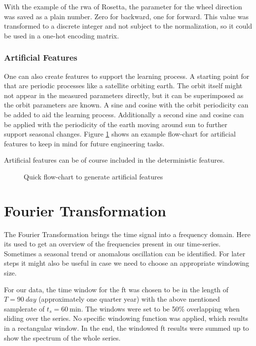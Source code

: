 		With the example of the \ac{rwa} of Rosetta, the parameter for the wheel direction was saved as a plain number. Zero for backward, one for forward. This value was transformed to a discrete integer and not subject to the normalization, so it could be used in a one-hot encoding matrix.		
		
		\subsubsection{Artificial Features}
		One can also create features to support the learning process. A starting point for that are periodic processes like a satellite orbiting earth. The orbit itself might not appear in the measured parameters directly, but it can be superimposed as the orbit parameters are known. A sine and cosine with the orbit periodicity can be added to aid the learning process. Additionally a second sine and cosine can be applied with the periodicity of the earth moving around sun to further support seasonal changes. Figure \ref{f:artificial_feature_example} shows an example flow-chart for artificial features to keep in mind for future engineering tasks.
		
		Artificial features can be of course included in the deterministic features.
		
		\begin{figure}[htb]
		\centering
		
		\caption{Quick flow-chart to generate artificial features}
		\label{f:artificial_feature_example}
		\end{figure}
		
\section{Fourier Transformation}
The Fourier Transformation brings the time signal into a frequency domain. Here its used to get an overview of the frequencies present in our time-series. Sometimes a seasonal trend or anomalous oscillation can be identified. For later steps it might also be useful in case we need to choose an appropriate windowing size.

For our data, the time window for the \ac{ft} was chosen to be in the length of $T = \SI{90}{day}$ (approximately one quarter year) with the above mentioned samplerate of $t_s = \SI{60}{\minute}$. The windows were set to be 50\% overlapping when sliding over the series. No specific windowing function was applied, which results in a rectangular window. In the end, the windowed \ac{ft} results were summed up to show the spectrum of the whole series.

